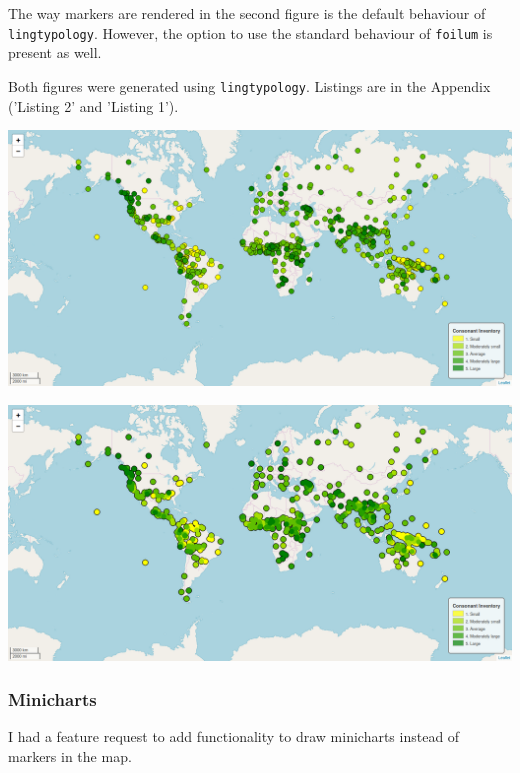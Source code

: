 \documentclass[a4paper,12pt]{article}
\begin{document}
The way markers are rendered in the second figure is the default behaviour of \texttt{lingtypology}. However, the option to use the standard behaviour of \texttt{foilum} is present as well.

Both figures were generated using \texttt{lingtypology}. Listings are in the Appendix ('Listing 2' and 'Listing 1').
\bigskip

\noindent
\begin{minipage}{\textwidth}
\includegraphics[width=\textwidth]{images/FoliumStrokeAppearance.png}
\bigskip
\end{minipage}

\noindent
\begin{minipage}{\textwidth}
\includegraphics[width=\textwidth]{images/LingtypologyStrokeAppearance.png}
\bigskip
\end{minipage}

\subsubsection{Minicharts}

I had a feature request to add functionality to draw minicharts instead of markers in the map.
\end{document}
